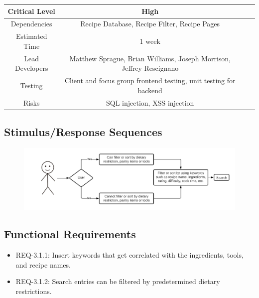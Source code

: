 \documentclass{scrreprt}
\begin{document}
\begin{center}
    \begin{tabular}{| c | c | c | c |}
        \hline
        Critical Level  & High                                                                 \\
        \hline
        Dependencies    & Recipe Database, Recipe Filter, Recipe Pages                         \\
        \hline
        Estimated Time  & 1 week                                                               \\
        \hline
        Lead Developers & Matthew Sprague, Brian Williams, Joseph Morrison, Jeffrey Rescignano \\
        \hline
        Testing         & Client and focus group frontend testing, unit testing for backend    \\
        \hline
        Risks           & \gls{SQL injection}, \gls{XSS injection}                             \\
        \hline
    \end{tabular}
\end{center}

\subsection{Stimulus/Response Sequences}

\begin{figure}[H]\centering
    \includegraphics[width=\columnwidth]{FlowCharts/Search-Search.png}
\end{figure}

\subsection{Functional Requirements}

\begin{itemize}
    \item REQ-3.1.1: Insert keywords that get correlated with the ingredients, tools, and recipe names.
    \item REQ-3.1.2: Search entries can be filtered by predetermined dietary restrictions.
\end{itemize}
\end{document}
